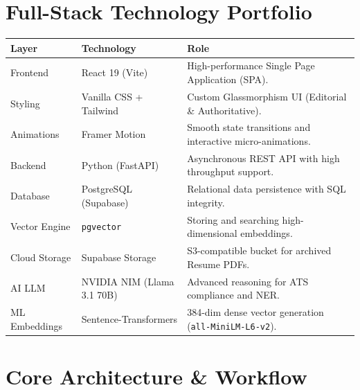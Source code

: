\documentclass[12pt, a4paper]{article}
\newcommand{\code}[1]{\texttt{\small #1}}
\begin{document}
\section{Full-Stack Technology Portfolio}

\begingroup
\setlength{\tabcolsep}{8pt}
\renewcommand{\arraystretch}{1.4}
\begin{tabularx}{\linewidth}{@{}L{2.5cm} L{4cm} X@{}}
    \toprule
    \textbf{Layer} & \textbf{Technology} & \textbf{Role} \\
    \midrule
    Frontend       & React 19 (Vite)           & High-performance Single Page Application (SPA). \\
    Styling        & Vanilla CSS + Tailwind     & Custom Glassmorphism UI (Editorial \& Authoritative). \\
    Animations     & Framer Motion             & Smooth state transitions and interactive micro-animations. \\
    Backend        & Python (FastAPI)           & Asynchronous REST API with high throughput support. \\
    Database       & PostgreSQL (Supabase)      & Relational data persistence with SQL integrity. \\
    Vector Engine  & \code{pgvector}            & Storing and searching high-dimensional embeddings. \\
    Cloud Storage  & Supabase Storage           & S3-compatible bucket for archived Resume PDFs. \\
    AI LLM         & NVIDIA NIM (Llama 3.1 70B) & Advanced reasoning for ATS compliance and NER. \\
    ML Embeddings  & Sentence-Transformers      & 384-dim dense vector generation (\code{all-MiniLM-L6-v2}). \\
    \bottomrule
\end{tabularx}
\endgroup

\section{Core Architecture \& Workflow}
\end{document}
